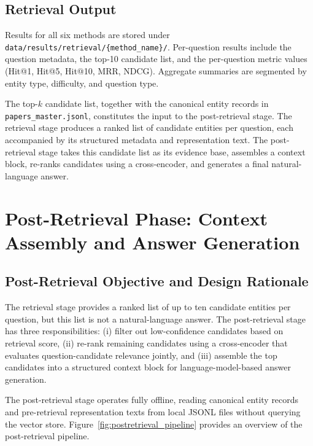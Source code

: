\subsection{Retrieval Output}
\label{subsec:retrieval_output}

Results for all six methods are stored under
\texttt{data/results/retrieval/\{method\_name\}/}.
Per-question results include the question metadata, the top-10 candidate list,
and the per-question metric values (Hit@1, Hit@5, Hit@10, MRR, NDCG).
Aggregate summaries are segmented by entity type, difficulty, and question
type.

The top-$k$ candidate list, together with the canonical entity records in
\texttt{papers\_master.jsonl}, constitutes the input to the post-retrieval
stage.
The retrieval stage produces a ranked list of candidate entities per question,
each accompanied by its structured metadata and representation text.
The post-retrieval stage takes this candidate list as its evidence base,
assembles a context block, re-ranks candidates using a cross-encoder, and
generates a final natural-language answer.

\section{Post-Retrieval Phase: Context Assembly and Answer Generation}
\label{sec:postretrieval}

\subsection{Post-Retrieval Objective and Design Rationale}
\label{subsec:postretrieval_objective}

The retrieval stage provides a ranked list of up to ten candidate entities per
question, but this list is not a natural-language answer.
The post-retrieval stage has three responsibilities: (i) filter out
low-confidence candidates based on retrieval score, (ii) re-rank remaining
candidates using a cross-encoder that evaluates question-candidate relevance
jointly, and (iii) assemble the top candidates into a structured context block
for language-model-based answer generation.

The post-retrieval stage operates fully offline, reading canonical entity
records and pre-retrieval representation texts from local JSONL files without
querying the vector store.
Figure~\ref{fig:postretrieval_pipeline} provides an overview of the
post-retrieval pipeline.

